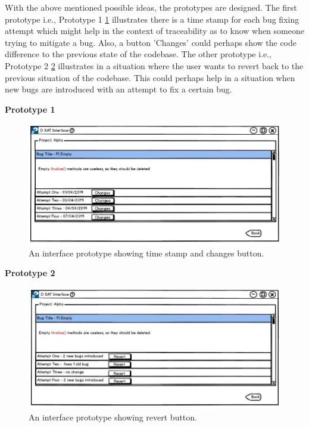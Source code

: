 With the above mentioned possible ideas, the prototypes are designed. The first prototype i.e., Prototype 1 \ref{fig:d_changes} illustrates there is a time stamp for each bug fixing attempt which might help in the context of traceability as to know when someone trying to mitigate a bug. Also, a button 'Changes' could perhaps show the code difference to the previous state of the codebase. The other prototype i.e., Prototype 2 \ref{fig:d_revert} illustrates in a situation where the user wants to revert back to the previous situation of the codebase. This could perhaps help in a situation when new bugs are introduced with an attempt to fix a certain bug.

\textbf{Prototype 1}
\begin{figure}[hbt!]
	\centering
	\includegraphics[width=\linewidth]{figures/d_changes}
	\caption{An interface prototype showing time stamp and changes button.}
	\label{fig:d_changes}
\end{figure}

\textbf{Prototype 2}
\begin{figure}[hbt!]
	\centering
	\includegraphics[width=\linewidth]{figures/d_revert}
	\caption{An interface prototype showing revert button.}
	\label{fig:d_revert}
\end{figure}

\let\cleardoublepage\clearpage